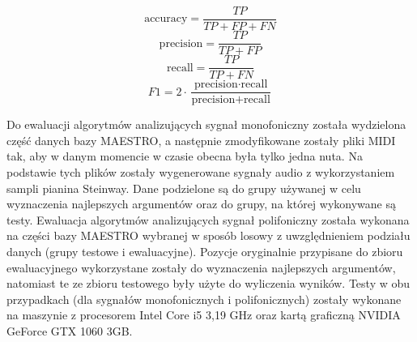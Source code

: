 \documentclass[12pt,a4paper,twoside]{mwart}
\begin{document}
\begin{equation} \label{eq:acc}
  \textrm{accuracy} = \frac{TP}{TP + FP + FN}
\end{equation}
\begin{equation} \label{eq:percision}
  \textrm{precision} = \frac{TP}{TP + FP}
\end{equation}
\begin{equation} \label{eq:recall}
  \textrm{recall} = \frac{TP}{TP + FN}
\end{equation}
\begin{equation}  \label{eq:f1}
  F1 = 2 \cdot  \frac{\textrm{precision} \cdot  \textrm{recall}}{\textrm{precision} + \textrm{recall}}
\end{equation}

Do ewaluacji algorytmów analizujących sygnał monofoniczny została wydzielona część danych bazy MAESTRO, a następnie zmodyfikowane zostały pliki MIDI tak, aby w danym momencie w czasie obecna była tylko jedna nuta. Na podstawie tych plików zostały wygenerowane sygnały audio z wykorzystaniem sampli pianina Steinway. Dane podzielone są do grupy używanej w celu wyznaczenia najlepszych argumentów oraz do grupy, na której wykonywane są testy. Ewaluacja algorytmów analizujących sygnał polifoniczny została wykonana na części bazy MAESTRO wybranej w sposób losowy z uwzględnieniem podziału danych (grupy testowe i ewaluacyjne). Pozycje oryginalnie przypisane do zbioru ewaluacyjnego wykorzystane zostały do wyznaczenia najlepszych argumentów, natomiast te ze zbioru testowego były użyte do wyliczenia wyników. Testy w obu przypadkach (dla sygnałów monofonicznych i polifonicznych) zostały wykonane na maszynie z procesorem Intel Core i5 3,19 GHz oraz kartą graficzną NVIDIA GeForce GTX 1060 3GB.
\end{document}

